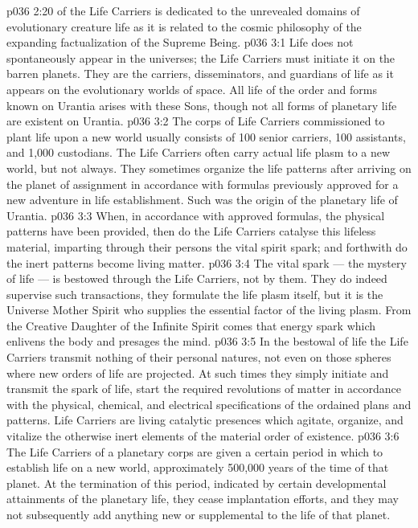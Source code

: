 \vs p036 2:20 \pc {} of the Life Carriers is dedicated to the unrevealed domains of evolutionary creature life as it is related to the cosmic philosophy of the expanding factualization of the Supreme Being.
\vs p036 3:1 Life does not spontaneously appear in the universes; the Life Carriers must initiate it on the barren planets. They are the carriers, disseminators, and guardians of life as it appears on the evolutionary worlds of space. All life of the order and forms known on Urantia arises with these Sons, though not all forms of planetary life are existent on Urantia.
\vs p036 3:2 The corps of Life Carriers commissioned to plant life upon a new world usually consists of 100 senior carriers, 100 assistants, and 1,000 custodians. The Life Carriers often carry actual life plasm to a new world, but not always. They sometimes organize the life patterns after arriving on the planet of assignment in accordance with formulas previously approved for a new adventure in life establishment. Such was the origin of the planetary life of Urantia.
\vs p036 3:3 When, in accordance with approved formulas, the physical patterns have been provided, then do the Life Carriers catalyse this lifeless material, imparting through their persons the vital spirit spark; and forthwith do the inert patterns become living matter.
\vs p036 3:4 \pc The vital spark --- the mystery of life --- is bestowed through the Life Carriers, not by them. They do indeed supervise such transactions, they formulate the life plasm itself, but it is the Universe Mother Spirit who supplies the essential factor of the living plasm. From the Creative Daughter of the Infinite Spirit comes that energy spark which enlivens the body and presages the mind.
\vs p036 3:5 \pc In the bestowal of life the Life Carriers transmit nothing of their personal natures, not even on those spheres where new orders of life are projected. At such times they simply initiate and transmit the spark of life, start the required revolutions of matter in accordance with the physical, chemical, and electrical specifications of the ordained plans and patterns. Life Carriers are living catalytic presences which agitate, organize, and vitalize the otherwise inert elements of the material order of existence.
\vs p036 3:6 \pc The Life Carriers of a planetary corps are given a certain period in which to establish life on a new world, approximately 500,000 years of the time of that planet. At the termination of this period, indicated by certain developmental attainments of the planetary life, they cease implantation efforts, and they may not subsequently add anything new or supplemental to the life of that planet.
